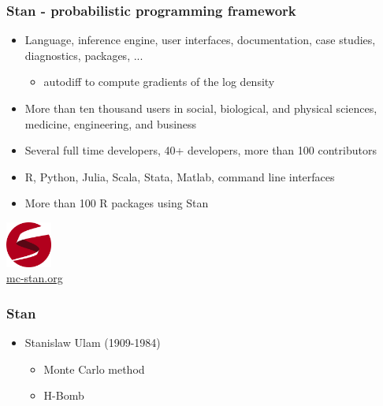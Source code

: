 \documentclass[10pt]{beamer}
\begin{document}
\begin{frame}

  \frametitle{Stan - probabilistic programming framework}

   \begin{itemize}
   \item Language, inference engine, user interfaces, documentation,
     case studies, diagnostics, packages, ...
     \begin{itemize}
     \item autodiff to compute gradients of the log density
     \end{itemize}
   \item<2-> More than ten thousand users in social, biological, and
     physical sciences, medicine, engineering, and business

   \item<3-> Several full time developers, 40+ developers, more than 100 contributors
   \item<4-> R, Python, Julia, Scala, Stata, Matlab, command line interfaces
    \item<4-> More than 100 R packages using Stan
   \end{itemize}
  \vfill
  \begin{center}
    \includegraphics[width=1.5cm]{figs/stan_logo_wide.png}\\
    \url{mc-stan.org}
  \end{center}
\end{frame}

\begin{frame}

\frametitle{Stan}

  \begin{itemize}
  \item Stanislaw Ulam (1909-1984)
    \begin{itemize}
    \item Monte Carlo method
    \item H-Bomb
    \end{itemize}
  \end{itemize}

\end{frame}
\end{document}
